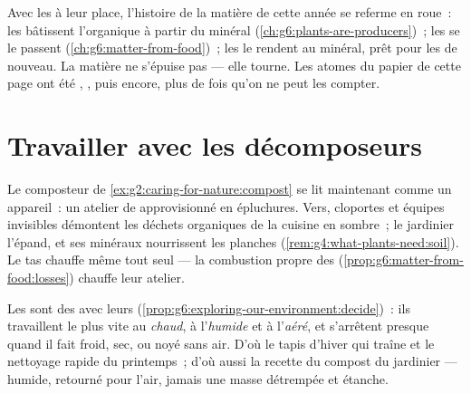\begin{remark}\label{rem:g6:decomposers-and-soil:circle}
Avec les  à leur place, l'histoire de la matière de
cette année se referme en roue~: les  bâtissent
l'organique à partir du minéral
(\cref{ch:g6:plants-are-producers})~; les  se le
passent (\cref{ch:g6:matter-from-food})~; les  le
rendent au minéral, prêt pour les  de nouveau. La matière
ne s'épuise pas --- elle tourne. Les atomes du papier de cette page
ont été , ,  puis  encore, plus de fois
qu'on ne peut les compter.
\end{remark}

\section{Travailler avec les décomposeurs}

\begin{example}\label{ex:g6:decomposers-and-soil:compost}
Le composteur de \cref{ex:g2:caring-for-nature:compost} se lit
maintenant comme un appareil~: un atelier de 
approvisionné en épluchures. Vers, cloportes et équipes invisibles
démontent les déchets organiques de la cuisine en  sombre~; le
jardinier l'épand, et ses minéraux nourrissent les planches
(\cref{rem:g4:what-plants-need:soil}). Le tas chauffe même tout
seul --- la combustion propre des 
(\cref{prop:g6:matter-from-food:losses}) chauffe leur atelier.
\end{example}

\begin{proposition}\label{prop:g6:decomposers-and-soil:speed}
Les  sont des  avec leurs 
(\cref{prop:g6:exploring-our-environment:decide})~: ils travaillent
le plus vite au \emph{chaud}, à l'\emph{humide} et à l'\emph{aéré},
et s'arrêtent presque quand il fait froid, sec, ou noyé sans air.
D'où le tapis d'hiver qui traîne et le nettoyage rapide du
printemps~; d'où aussi la recette du compost du jardinier ---
humide, retourné pour l'air, jamais une masse détrempée et
étanche.
\end{proposition}
\admitted

